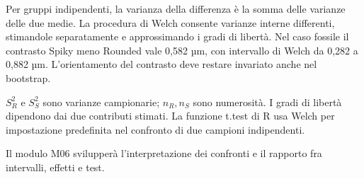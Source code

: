 \documentclass[12pt,aspectratio=1610]{beamer}
\newcommand{\MeasureBox}[2]{\typeout{GEOBOX:#1:\the\wd#2:\the\ht#2:\the\dp#2}}
\begin{document}
\begin{lrbox}{\BodyBox}\begin{minipage}[t]{10.25cm}\raggedright\sloppy\color{Ink}\fontsize{12.4}{16.4}\selectfont Per gruppi indipendenti, la varianza della differenza è la somma delle varianze delle due medie. La procedura di Welch consente varianze interne differenti, stimandole separatamente e approssimando i gradi di libertà. Nel caso fossile il contrasto Spiky meno Rounded vale 0,582 µm, con intervallo di Welch da 0,282 a 0,882 µm. L’orientamento del contrasto deve restare invariato anche nel bootstrap.\par{}\end{minipage}\end{lrbox}
\begin{lrbox}{\SideBox}\begin{minipage}[t]{7.45cm}\raggedright\sloppy\color{Ink}\fontsize{12.2}{16.1}\selectfont $S_R^2$ e $S_S^2$ sono varianze campionarie; $n_R,n_S$ sono numerosità. I gradi di libertà dipendono dai due contributi stimati. La funzione t.test di R usa Welch per impostazione predefinita nel confronto di due campioni indipendenti.\par{}\end{minipage}\end{lrbox}
\begin{lrbox}{\RecallBox}\begin{minipage}[t]{16.45cm}\raggedright\sloppy\color{Ink}\fontsize{10.1}{13.2}\selectfont Il modulo M06 svilupperà l’interpretazione dei confronti e il rapporto fra intervalli, effetti e test.\end{minipage}\end{lrbox}
\MeasureBox{51-TitleBox}{\TitleBox}
\end{document}
